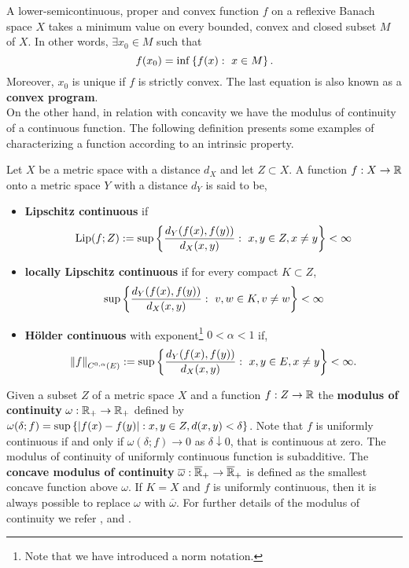 A  lower-semicontinuous, proper and convex function $f$ on a reflexive Banach space $X$ takes a minimum value on every bounded, convex and closed subset $M$ of $X$. In other words, $\exists x_0 \in M$ such that
\begin{equation}
f(x_0)=\inf\left\lbrace f(x):\ x\in M \right\rbrace.
\end{equation}
Moreover, $x_0$ is unique if $f$ is strictly convex. The last equation is also known as a \textbf{convex program}. \\

On the other hand, in relation with concavity we have the modulus of continuity of a continuous function. The following definition presents some examples of characterizing a function according to an intrinsic property.
\begin{definition}
	Let $X$ be a metric space with a distance $d_X$ and let $Z \subset X$. A function $f: X\rightarrow \mathbb{R}$ onto a metric space $Y$ with a distance $d_Y$ is said to be,
	\begin{itemize}
		\item \textbf{Lipschitz continuous} if
		\begin{equation*}
		\mathrm{Lip}(f; Z):=\sup\left\lbrace \frac{d_Y(f(x), f(y))}{d_X(x,y)}: \ x,y \in Z, x\neq y \right\rbrace < \infty
		\end{equation*}
		\item \textbf{locally Lipschitz continuous} if for every compact $K\subset Z$,
		\begin{equation*}
		\sup\left\lbrace \frac{d_Y(f(x), f(y))}{d_X(x,y)}: \ v,w \in K, v\neq w \right\rbrace<\infty
		\end{equation*}
		\item  \textbf{H\"older continuous} with exponent\footnote{Note that we have introduced a norm notation.} $0<\alpha<1$ if,
		\begin{equation*}
			\left\|f\right\|_{C^{0,\alpha}(E)}:=\sup\left\lbrace \frac{d_Y(f(x),f(y))}{d_X(x,y)}: \ x, y \in E, x\neq y \right\rbrace<\infty.
		\end{equation*}
	\end{itemize}
\end{definition}
Given a subset $Z$ of a metric space $X$ and a function $f: Z\rightarrow \mathbb{R}$ the \textbf{modulus of continuity} $\omega:\mathbb{R}_+\rightarrow \mathbb{R}_+$ defined by $\omega(\delta;f)=\sup\left\lbrace \left| f(x)-f(y) \right|: x,y \in Z, d(x,y)<\delta \right\rbrace$. Note that $f$ is uniformly continuous if and only if $\omega(\delta; f)\rightarrow 0$ as $\delta\downarrow 0$, that is continuous at zero. The modulus of continuity of uniformly continuous function is subadditive. The \textbf{concave modulus of continuity} $\overline{\omega}:\overline{\mathbb{R}}_+\rightarrow \overline{\mathbb{R}}_+$ is defined as the smallest concave function above $\omega$. If $K=X$ and $f$ is uniformly continuous, then it is always possible to replace $\omega$ with $\overline{\omega}$. For further details of the modulus of continuity we refer \cite{Steffens2006HistoryofApprox}, \cite{Zygmund} and \cite{Fonseca2007ModCalculculusofVar}.
